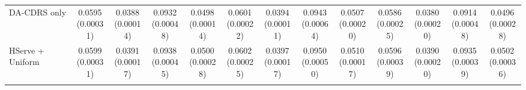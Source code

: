 \begin{table}[t]
\begin{tabular*}{\textwidth}{@{\extracolsep{\fill}} l *{12}{c} @{}}
DA-CDRS only & \shortstack[c]{0.0595\\[-1pt]{\tiny(0.00031)}} & \shortstack[c]{0.0388\\[-1pt]{\tiny(0.00014)}} & \shortstack[c]{0.0932\\[-1pt]{\tiny(0.00048)}} & \shortstack[c]{0.0498\\[-1pt]{\tiny(0.00014)}} & \shortstack[c]{0.0601\\[-1pt]{\tiny(0.00022)}} & \shortstack[c]{0.0394\\[-1pt]{\tiny(0.00011)}} & \shortstack[c]{0.0943\\[-1pt]{\tiny(0.00064)}} & \shortstack[c]{0.0507\\[-1pt]{\tiny(0.00020)}} & \shortstack[c]{0.0586\\[-1pt]{\tiny(0.00025)}} & \shortstack[c]{0.0380\\[-1pt]{\tiny(0.00020)}} & \shortstack[c]{0.0914\\[-1pt]{\tiny(0.00048)}} & \shortstack[c]{0.0496\\[-1pt]{\tiny(0.00028)}} \\
HServe + Uniform & \shortstack[c]{0.0599\\[-1pt]{\tiny(0.00031)}} & \shortstack[c]{0.0391\\[-1pt]{\tiny(0.00017)}} & \shortstack[c]{0.0938\\[-1pt]{\tiny(0.00045)}} & \shortstack[c]{0.0500\\[-1pt]{\tiny(0.00028)}} & \shortstack[c]{0.0602\\[-1pt]{\tiny(0.00025)}} & \shortstack[c]{0.0397\\[-1pt]{\tiny(0.00017)}} & \shortstack[c]{0.0950\\[-1pt]{\tiny(0.00050)}} & \shortstack[c]{0.0510\\[-1pt]{\tiny(0.00017)}} & \shortstack[c]{0.0596\\[-1pt]{\tiny(0.00039)}} & \shortstack[c]{0.0390\\[-1pt]{\tiny(0.00020)}} & \shortstack[c]{0.0935\\[-1pt]{\tiny(0.00039)}} & \shortstack[c]{0.0502\\[-1pt]{\tiny(0.00036)}} \\
\addlinespace[1pt]

\end{tabular*}
\end{table}
